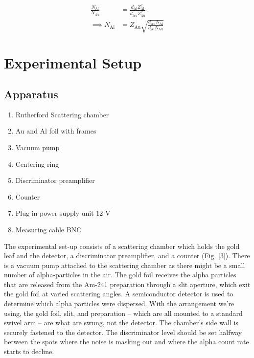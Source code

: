 \begin{align} \label{eq:part2}
    \frac{N_\text{Al}}{N_\text{Au}} &= \frac{d_\text{Al}Z^2_\text{Al}}{d_\text{Au}Z^2_\text{Au}} \nonumber\\
    \implies N_\text{Al} &= Z_\text{Au}\sqrt{\frac{d_\text{Au}N_\text{Al}}{d_\text{Al}N_\text{Au}}}
\end{align}

\section{Experimental Setup}

\subsection*{Apparatus}

\begin{enumerate}
    \item Rutherford Scattering chamber
    \item Au and Al foil with frames
    \item Vacuum pump
    \item Centering ring
    \item Discriminator preamplifier
    \item Counter
    \item Plug-in power supply unit 12 V
    \item Measuring cable BNC\\
\end{enumerate}

The experimental set-up consists of a scattering chamber
which holds the gold leaf and the detector, a discriminator
preamplifier, and a counter (Fig. \ref{3}). There is a vacuum pump attached to the scattering chamber as there might be a small number of alpha-particles in the air. The gold foil receives the alpha particles that are released from the Am-241 preparation through a slit
aperture, which exit the gold foil at varied scattering angles. A semiconductor detector is used to determine which alpha particles were
dispersed. With the arrangement we’re using, the gold
foil, slit, and preparation -- which are all mounted to a
standard swivel arm -- are what are swung, not the detector. The chamber’s side wall is securely fastened to the
detector. The discriminator level should be set halfway
between the spots where the noise is masking out and
where the alpha count rate starts to decline.

